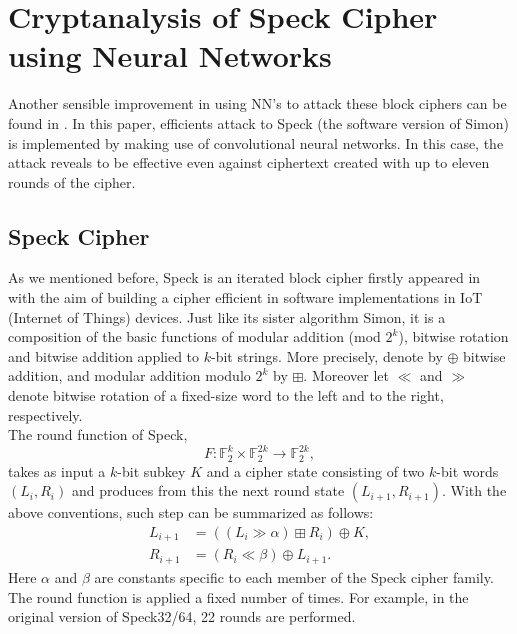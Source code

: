 \documentclass[%
    corpo=11pt,
    twoside,
    stile=classica,
    oldstyle,
    autoretitolo,
    tipotesi=magistrale,
    greek,
    evenboxes,
    english
]{toptesi}
\begin{document}
\section{Cryptanalysis of Speck Cipher using Neural Networks}
Another sensible improvement in using NN's to attack these block ciphers can be found in \cite{gohr}. In this paper, efficients attack to Speck (the software version of Simon) is implemented by making use of convolutional neural networks. In this case, the attack reveals to be effective even against ciphertext created with up to eleven rounds of the cipher.

\subsection{Speck Cipher}
As we mentioned before, Speck is an iterated block cipher firstly appeared in \cite{nsa} with the aim of building a cipher efficient in software implementations in IoT (Internet of Things) devices. Just like its sister algorithm Simon, it is a composition of the basic functions of modular addition (mod $2^k$), bitwise rotation and bitwise addition applied to $k$-bit strings. More precisely, denote by $\oplus$ bitwise addition, and modular addition modulo $2^k$ by $\boxplus$. Moreover let $\ll$ and $\gg$ denote bitwise rotation of a fixed-size word to the left and to the right, respectively.  \\
The round function of Speck,
\begin{equation}
F: \mathbb{F}_2^k \times \mathbb{F}_2^{2k} \longrightarrow \mathbb{F}_2^{2k},
\end{equation}
takes as input a $k$-bit subkey $K$ and a cipher state consisting of two $k$-bit words $(L_i,R_i)$ and produces from this the next round state $(L_{i+1}, R_{i+1})$. With the above conventions, such step can be summarized as follows:
\begin{align}
L_{i+1} &= \left((L_i \gg \alpha) \boxplus R_i \right) \oplus K, \\
R_{i+1} &= \left(R_i \ll \beta \right) \oplus L_{i+1}.
\end{align}
Here $\alpha$ and $\beta$ are constants specific to each member of the Speck cipher family. The round function is applied a fixed number of times. For example, in the original version of Speck32/64, 22 rounds are performed.
\end{document}
